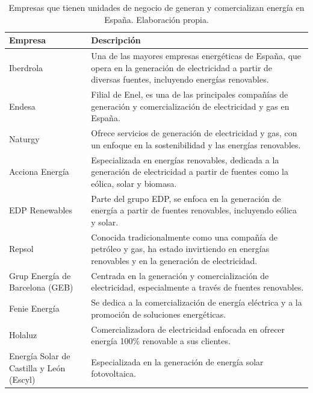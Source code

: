\documentclass{article}
\begin{document}
\begin{table}[h]
    \centering
    \begin{tabular}{|p{4cm}|p{11cm}|}
        \hline
        \textbf{Empresa}                                      & \textbf{Descripción}                                                                                                                                           \\ \hline
        Iberdrola                                    & Una de las mayores empresas energéticas de España, que opera en la generación de electricidad a partir de diversas fuentes, incluyendo energías renovables.    \\ \hline
        Endesa                                       & Filial de Enel, es una de las principales compañías de generación y comercialización de electricidad y gas en España.                                           \\ \hline
        Naturgy                                      & Ofrece servicios de generación de electricidad y gas, con un enfoque en la sostenibilidad y las energías renovables.                                           \\ \hline
        Acciona Energía                              & Especializada en energías renovables, dedicada a la generación de electricidad a partir de fuentes como la eólica, solar y biomasa.                           \\ \hline
        EDP Renewables                               & Parte del grupo EDP, se enfoca en la generación de energía a partir de fuentes renovables, incluyendo eólica y solar.                                          \\ \hline
        Repsol                                       & Conocida tradicionalmente como una compañía de petróleo y gas, ha estado invirtiendo en energías renovables y en la generación de electricidad.                   \\ \hline
        Grup Energía de Barcelona (GEB)             & Centrada en la generación y comercialización de electricidad, especialmente a través de fuentes renovables.                                                     \\ \hline
        Fenie Energía                                & Se dedica a la comercialización de energía eléctrica y a la promoción de soluciones energéticas.                                                                  \\ \hline
        Holaluz                                      & Comercializadora de electricidad enfocada en ofrecer energía 100\% renovable a sus clientes.                                                                      \\ \hline
        Energía Solar de Castilla y León (Escyl)    & Especializada en la generación de energía solar fotovoltaica.                                                                                                   \\ \hline
    \end{tabular}
    \caption{Empresas que tienen unidades de negocio de generan y comercializan energía en España. Elaboración propia.}
    \label{tab:energia}
\end{table}
\end{document}
